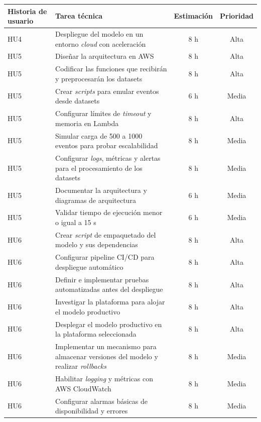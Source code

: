 \documentclass[
11pt, %
]{charter}
\begin{document}
\begin{table}[htpb]
\centering
\begin{tabularx}{\linewidth}{@{}|X|X|c|c|@{}}
\hline
\rowcolor[HTML]{C0C0C0}
Historia de usuario & Tarea técnica & Estimación & Prioridad \\ \hline
HU4 & Despliegue del modelo en un entorno \textit{cloud} con aceleración 					 & 8 h & Alta \\ \hline
HU5 & Diseñar la arquitectura en AWS & 8 h & Alta \\ \hline
HU5 & Codificar las funciones que recibirán y preprocesarán los datasets 					 & 8 h & Alta \\ \hline
HU5 & Crear \textit{scripts} para emular eventos desde datasets 						 & 6 h & Media \\ \hline
HU5 & Configurar límites de \textit{timeout} y memoria en Lambda	 					 & 8 h & Alta \\ \hline
HU5 & Simular carga de 500 a 1000 eventos para probar escalabilidad		 					 & 8 h & Media \\ \hline
HU5 & Configurar \textit{logs}, métricas y alertas para el procesamiento de los datasets 					 & 8 h & Media \\ \hline
HU5 & Documentar la arquitectura y diagramas de arquitectura 					 & 6 h & Media \\ \hline
HU5 & Validar tiempo de ejecución menor o igual a 15 s 					 & 6 h & Media \\ \hline
HU6 & Crear \textit{script} de empaquetado del modelo y sus dependencias 					 & 8 h & Alta \\ \hline
HU6 & Configurar pipeline CI/CD para despliegue automático 					 & 8 h & Alta \\ \hline
HU6 & Definir e implementar pruebas automatizadas antes del despliegue 					 & 8 h & Alta \\ \hline
HU6 & Investigar la plataforma para alojar el modelo productivo  					 & 8 h & Alta \\ \hline
HU6 & Desplegar el modelo productivo en la plataforma seleccionada  					 & 8 h & Alta \\ \hline
HU6 & Implementar un mecanismo para almacenar versiones del modelo y realizar \textit{rollbacks}	 					 & 8 h & Media \\ \hline
HU6 & Habilitar \textit{logging} y métricas con AWS CloudWatch	 					 & 8 h & Media \\ \hline
HU6 & Configurar alarmas básicas de disponibilidad y errores	 					 & 8 h & Media \\ \hline

\end{tabularx}
\end{table}
\end{document}
